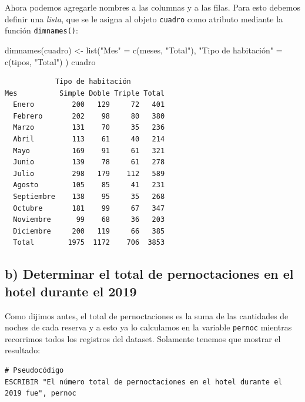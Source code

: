 \documentclass[
]{book}
\newenvironment{Shaded}{\begin{snugshade}}{\end{snugshade}}
\newcommand{\FunctionTok}[1]{\textcolor[rgb]{0.00,0.00,0.00}{#1}}
\newcommand{\NormalTok}[1]{#1}
\newcommand{\OtherTok}[1]{\textcolor[rgb]{0.56,0.35,0.01}{#1}}
\newcommand{\StringTok}[1]{\textcolor[rgb]{0.31,0.60,0.02}{#1}}
\begin{document}
Ahora podemos agregarle nombres a las columnas y a las filas. Para esto debemos definir una \emph{lista}, que se le asigna al objeto \texttt{cuadro} como atributo mediante la función \texttt{dimnames()}:

\begin{Shaded}
\begin{Highlighting}[]
\FunctionTok{dimnames}\NormalTok{(cuadro) }\OtherTok{\textless{}{-}} \FunctionTok{list}\NormalTok{(}\StringTok{"Mes"} \OtherTok{=} \FunctionTok{c}\NormalTok{(meses, }\StringTok{"Total"}\NormalTok{), }
                         \StringTok{"Tipo de habitación"} \OtherTok{=} \FunctionTok{c}\NormalTok{(tipos, }\StringTok{"Total"}\NormalTok{) )}
\NormalTok{cuadro}
\end{Highlighting}
\end{Shaded}

\begin{verbatim}
            Tipo de habitación
Mes          Simple Doble Triple Total
  Enero         200   129     72   401
  Febrero       202    98     80   380
  Marzo         131    70     35   236
  Abril         113    61     40   214
  Mayo          169    91     61   321
  Junio         139    78     61   278
  Julio         298   179    112   589
  Agosto        105    85     41   231
  Septiembre    138    95     35   268
  Octubre       181    99     67   347
  Noviembre      99    68     36   203
  Diciembre     200   119     66   385
  Total        1975  1172    706  3853
\end{verbatim}

\hypertarget{b-determinar-el-total-de-pernoctaciones-en-el-hotel-durante-el-2019}{%
\subsection{b) Determinar el total de pernoctaciones en el hotel durante el 2019}\label{b-determinar-el-total-de-pernoctaciones-en-el-hotel-durante-el-2019}}

Como dijimos antes, el total de pernoctaciones es la suma de las cantidades de noches de cada reserva y a esto ya lo calculamos en la variable \texttt{pernoc} mientras recorrimos todos los registros del dataset. Solamente tenemos que mostrar el resultado:

\begin{verbatim}
# Pseudocódigo
ESCRIBIR "El número total de pernoctaciones en el hotel durante el 2019 fue", pernoc
\end{verbatim}
\end{document}
